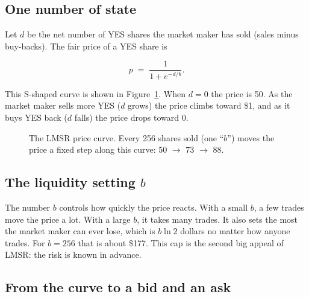 \documentclass[11pt]{article}
\newcommand{\cent}{\textcent}
\begin{document}
\subsection{One number of state}

Let $d$ be the net number of YES shares the market maker has sold (sales minus
buy-backs). The fair price of a YES share is

\[
  p \;=\; \frac{1}{1 + e^{-d/b}} .
\]

This S-shaped curve is shown in Figure~\ref{fig:curve}. When $d = 0$ the price
is 50\cent. As the market maker sells more YES ($d$ grows) the price climbs
toward \$1, and as it buys YES back ($d$ falls) the price drops toward 0.

\begin{figure}[h]
\centering
{}
\caption{The LMSR price curve. Every 256 shares sold (one ``$b$'') moves the
price a fixed step along this curve: 50\cent{} $\to$ 73\cent{} $\to$ 88\cent.}
\label{fig:curve}
\end{figure}

\subsection{The liquidity setting $b$}

The number $b$ controls how quickly the price reacts. With a small $b$, a few
trades move the price a lot. With a large $b$, it takes many trades. It also
sets the most the market maker can ever lose, which is $b \ln 2$ dollars no
matter how anyone trades. For $b = 256$ that is about \$177. This cap is the
second big appeal of LMSR: the risk is known in advance.

\subsection{From the curve to a bid and an ask}
\end{document}

